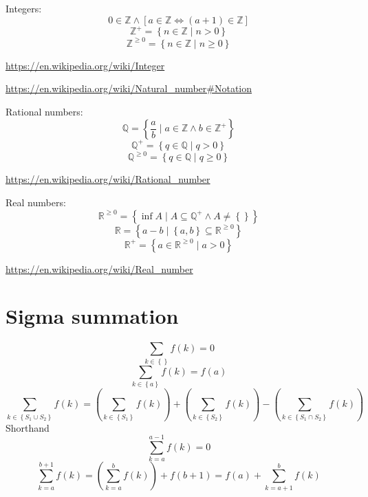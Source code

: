 \documentclass[]{article}
\newcommand{\pqty}[1]{{\left(#1\right)}}
\newcommand{\Bqty}[1]{{\left\{#1\right\}}}
\newcommand{\bqty}[1]{{\left[#1\right]}}
\numberwithin{equation}{section}
\begin{document}
	Integers:
	\begin{equation}
	0\in\mathbb{Z}\land\bqty{a\in\mathbb{Z}\Leftrightarrow \pqty{a+1}\in\mathbb{Z}}
	\end{equation}
	\begin{equation}
	\mathbb{Z}^+=\Bqty{n\in\mathbb{Z}\mid n>0}
	\end{equation}
	\begin{equation}
	\mathbb{Z}^{\geq 0}=\Bqty{n\in\mathbb{Z}\mid n\geq 0}
	\end{equation}
	
	\url{https://en.wikipedia.org/wiki/Integer}
	
	\url{https://en.wikipedia.org/wiki/Natural_number#Notation}
	
	Rational numbers:
	\begin{equation}
	\mathbb{Q}=\Bqty{\frac{a}{b}\mid a\in\mathbb{Z}\land b\in\mathbb{Z}^+}
	\end{equation}
	\begin{equation}
	\mathbb{Q}^+=\Bqty{q\in\mathbb{Q}\mid q>0}
	\end{equation}
	\begin{equation}
	\mathbb{Q}^{\geq 0}=\Bqty{q\in\mathbb{Q}\mid q\geq 0}
	\end{equation}
	
	\url{https://en.wikipedia.org/wiki/Rational_number}
	
	Real numbers:
	\begin{equation}
	\mathbb{R}^{\geq 0}=\Bqty{\inf A\mid A\subseteq\mathbb{Q}^+\land A\neq \Bqty{}}
	\end{equation}
	\begin{equation}
	\mathbb{R}=\Bqty{a-b\mid \Bqty{a,b}\subseteq\mathbb{R}^{\geq 0}}
	\end{equation}
	\begin{equation}
	\mathbb{R}^+=\Bqty{a\in\mathbb{R}^{\geq 0}\mid a>0}
	\end{equation}
	
	\url{https://en.wikipedia.org/wiki/Real_number}
	
	\section{Sigma summation}
	\begin{equation}
	\sum_{k\in\Bqty{}}f\pqty{k}=0
	\end{equation}
	\begin{equation}
	\sum_{k\in\Bqty{a}}f\pqty{k}=f\pqty{a}
	\end{equation}
	\begin{equation}
	\sum_{k\in\Bqty{S_1\cup S_2}}f\pqty{k}
	=
	\pqty{\sum_{k\in\Bqty{S_1}}f\pqty{k}}
	+
	\pqty{\sum_{k\in\Bqty{S_2}}f\pqty{k}}
	-
	\pqty{\sum_{k\in\Bqty{S_1\cap S_2}}f\pqty{k}}
	\end{equation}
	Shorthand
	\begin{equation}
	\sum_{k={a}}^{a-1} f\pqty{k}=0
	\end{equation}
	\begin{equation}
	\sum_{k={a}}^{b+1} f\pqty{k}=
	\pqty{\sum_{k={a}}^{b} f\pqty{k}}+f\pqty{b+1}=
	f\pqty{a}+{\sum_{k={a+1}}^{b} f\pqty{k}}
	\end{equation}
	
\end{document}
